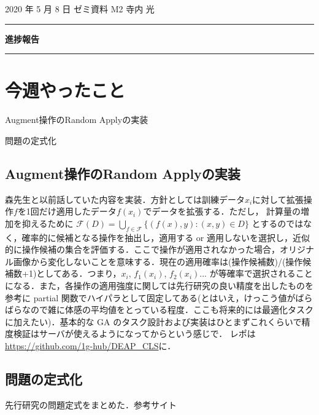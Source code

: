 \documentclass[onecolumn]{ujarticle}   %
\begin{document}
	\noindent

	\hspace{1em}
	2020 年 5 月 8 日
	ゼミ資料
	\hfill
	M2 寺内 光

	\vspace{2mm}

	\hrule

	\begin{center}
		{\Large \bf 進捗報告}
	\end{center}


	\hrule
	\vspace{3mm}

	\section{今週やったこと}
	\begin{itemize}{
		\item{Augment操作のRandom Applyの実装}
		\item{問題の定式化}
	}\end{itemize}

	\subsection{Augment操作のRandom Applyの実装}
	森先生と以前話していた内容を実装．方針としては訓練データ$x_{i}$に対して拡張操作$f$を1回だけ適用したデータ$f(x_{i})$でデータを拡張する．ただし，
	計算量の増加を抑えるために $\mathcal{F}(D) = \bigcup_{f \in \mathcal{F}}\{ (f(x), y): (x, y) \in D \}$ とするのではなく，確率的に候補となる操作を抽出し，適用する or 適用しないを選択し，近似的に操作候補の集合を評価する．ここで操作が適用されなかった場合，オリジナル画像から変化しないことを意味する．現在の適用確率は(操作候補数)/(操作候補数+1)としてある．つまり，$x_{i}$, $f_{1}(x_{i})$, $f_{2}(x_{i})...$ が等確率で選択されることになる．また，各操作の適用強度に関しては先行研究の良い精度を出したものを参考に partial 関数でハイパラとして固定してある(とはいえ，けっこう値がばらばらなので雑に体感の平均値をとっている程度．ここも将来的には最適化タスクに加えたい)．基本的な GA のタスク設計および実装はひとまずこれくらいで精度検証はサーバが使えるようになってからという感じで．
	レポは\url{https://github.com/1g-hub/DEAP_CLS}に．

	\subsection{問題の定式化}
	先行研究の問題定式をまとめた．参考サイト \cite{fastautoaugument}
\end{document}
